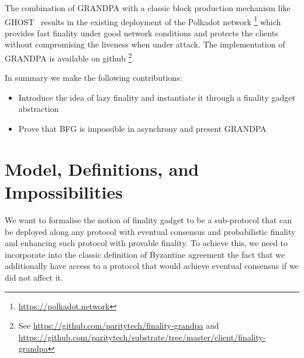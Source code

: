 \documentclass{article}
\begin{document}
The combination of GRANDPA with a classic block production mechanism like GHOST~\cite{lewenberg15inclusive} results in the existing deployment of the Polkadot network \footnote{\url{https://polkadot.network}} which provides fast finality under good network conditions and protects the clients without compromising the liveness when under attack. The implementation of GRANDPA is available on github \footnote{See \url{https://github.com/paritytech/finality-grandpa} and \url{https://github.com/paritytech/substrate/tree/master/client/finality-grandpa}}.


In summary we make the following contributions:
\begin{itemize}

\item Introduce the idea of lazy finality and instantiate it through a finality gadget abstraction

\item Prove that BFG is impossible in asynchrony and present GRANDPA

\end{itemize}






\section{Model, Definitions, and Impossibilities}


We want to formalise the notion of finality gadget to be a sub-protocol that can be deployed along any protocol with
eventual consensus and probabilistic finality and enhancing such protocol with provable finality.
To achieve this, we need to incorporate into the classic definition of Byzantine agreement 
the fact that we additionally have access to a protocol that would achieve eventual consensus if we did not affect it.
\end{document}
